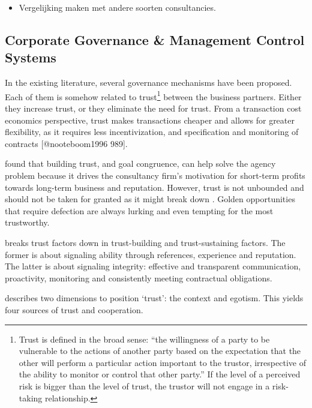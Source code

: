 \documentclass[12pt]{article}
\providecommand{\tightlist}{%
  \setlength{\itemsep}{0pt}\setlength{\parskip}{0pt}}
\begin{document}
\begin{itemize}
\tightlist
\item
  Vergelijking maken met andere soorten consultancies.
\end{itemize}

\hypertarget{corporate-governance-management-control-systems}{%
\subsection{Corporate Governance \& Management Control
Systems}\label{corporate-governance-management-control-systems}}

In the existing literature, several governance mechanisms have been
proposed. Each of them is somehow related to trust\footnote{Trust is
  defined in the broad sense: ``the willingness of a party to be
  vulnerable to the actions of another party based on the expectation
  that the other will perform a particular action important to the
  trustor, irrespective of the ability to monitor or control that other
  party.'' \citep{kee1970} If the level of a perceived risk is bigger
  than the level of trust, the trustor will not engage in a risk-taking
  relationship.} between the business partners. Either they increase
trust, or they eliminate the need for trust. From a transaction cost
economics perspective, trust makes transactions cheaper and allows for
greater flexibility, as it requires less incentivization, and
specification and monitoring of contracts {[}@nooteboom1996 989{]}.

\citet[265]{liberatore2010} found that building trust, and goal
congruence, can help solve the agency problem because it drives the
consultancy firm's motivation for short-term profits towards long-term
business and reputation. However, trust is not unbounded and should not
be taken for granted as it might break down \citep[ 988]{nooteboom1996}.
Golden opportunities that require defection are always lurking and even
tempting for the most trustworthy.

\citet[193-194]{kirilov2012} breaks trust factors down in trust-building
and trust-sustaining factors. The former is about signaling ability
through references, experience and reputation. The latter is about
signaling integrity: effective and transparent communication,
proactivity, monitoring and consistently meeting contractual
obligations.

\citet{williams1988} describes two dimensions to position `trust': the
context and egotism. This yields four sources of trust and cooperation.
\end{document}
